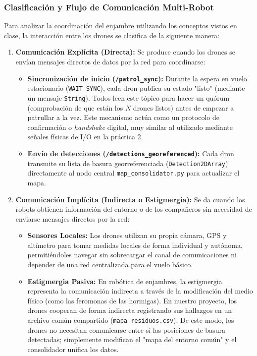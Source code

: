 \documentclass[11pt,a4paper]{article}
\begin{document}
\subsubsection{Clasificación y Flujo de Comunicación Multi-Robot}
Para analizar la coordinación del enjambre utilizando los conceptos vistos en clase, la interacción entre los drones se clasifica de la siguiente manera:

\begin{enumerate}
    \item \textbf{Comunicación Explícita (Directa):}
    Se produce cuando los drones se envían mensajes directos de datos por la red para coordinarse:
    \begin{itemize}
        \item \textbf{Sincronización de inicio (\texttt{/patrol\_}\allowbreak\texttt{sync}):} Durante la espera en vuelo estacionario (\texttt{WAIT\_}\allowbreak\texttt{SYNC}), cada dron publica su estado "listo" (mediante un mensaje \texttt{String}). Todos leen este tópico para hacer un quórum (comprobación de que están los $N$ drones listos) antes de empezar a patrullar a la vez. Este mecanismo actúa como un protocolo de confirmación o \textit{handshake} digital, muy similar al utilizado mediante señales físicas de I/O en la práctica 2.
        \item \textbf{Envío de detecciones (\texttt{/detections\_}\allowbreak\texttt{georeferenced}):} Cada dron transmite su lista de basura georreferenciada (\texttt{Detection2DArray}) directamente al nodo central \texttt{map\_}\allowbreak\texttt{consolidator.py} para actualizar el mapa.
    \end{itemize}
    
    \item \textbf{Comunicación Implícita (Indirecta o Estigmergia):}
    Se da cuando los robots obtienen información del entorno o de los compañeros sin necesidad de enviarse mensajes directos por la red:
    \begin{itemize}
        \item \textbf{Sensores Locales:} Los drones utilizan su propia cámara, GPS y altímetro para tomar medidas locales de forma individual y autónoma, permitiéndoles navegar sin sobrecargar el canal de comunicaciones ni depender de una red centralizada para el vuelo básico.
        \item \textbf{Estigmergia Pasiva:} En robótica de enjambres, la estigmergia representa la comunicación indirecta a través de la modificación del medio físico (como las feromonas de las hormigas). En nuestro proyecto, los drones cooperan de forma indirecta registrando sus hallazgos en un archivo común compartido (\texttt{mapa\_residuos.csv}). De este modo, los drones no necesitan comunicarse entre sí las posiciones de basura detectadas; simplemente modifican el "mapa del entorno común" y el consolidador unifica los datos.
    \end{itemize}


\end{enumerate}
\end{document}
